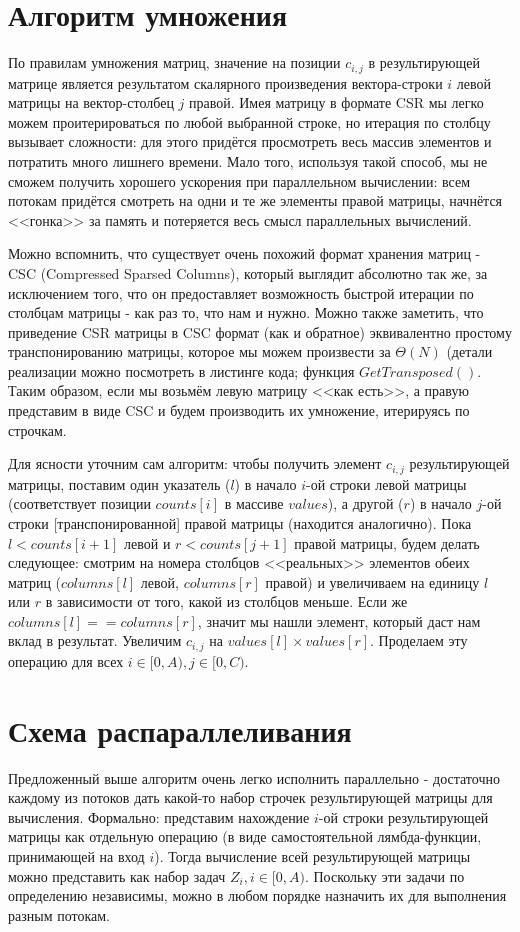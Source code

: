 \documentclass{report}
\begin{document}
\newpage
\section*{Алгоритм умножения}
По правилам умножения матриц, значение на позиции $c_{i, j}$ в результирующей матрице является результатом скалярного произведения вектора-строки $i$ левой матрицы на вектор-столбец $j$ правой. Имея матрицу в формате CSR мы легко можем проитерироваться по любой выбранной строке, но итерация по столбцу вызывает сложности: для этого придётся просмотреть весь массив элементов и потратить много лишнего времени. Мало того, используя такой способ, мы не сможем получить хорошего ускорения при параллельном вычислении: всем потокам придётся смотреть на одни и те же элементы правой матрицы, начнётся <<гонка>> за память и потеряется весь смысл параллельных вычислений.

Можно вспомнить, что существует очень похожий формат хранения матриц - CSC (Compressed Sparsed Columns), который выглядит абсолютно так же, за исключением того, что он предоставляет возможность быстрой итерации по столбцам матрицы - как раз то, что нам и нужно. Можно также заметить, что приведение CSR матрицы в CSC формат (как и обратное) эквивалентно простому транспонированию матрицы, которое мы можем произвести за $\Theta(N)$ (детали реализации можно посмотреть в листинге кода; функция $GetTransposed()$. Таким образом, если мы возьмём левую матрицу <<как есть>>, а правую представим в виде CSC и будем производить их умножение, итерируясь по строчкам.

Для ясности уточним сам алгоритм: чтобы получить элемент $c_{i,j}$ результирующей матрицы, поставим один указатель ($l$) в начало $i$-ой строки левой матрицы (соответствует позиции $counts[i]$ в массиве $values$), а другой ($r$) в начало $j$-ой строки [транспонированной] правой матрицы (находится аналогично). Пока $l < counts[i+1]$ левой и $r < counts[j+1]$ правой матрицы, будем делать следующее: смотрим на номера столбцов <<реальных>> элементов обеих матриц ($columns[l]$ левой, $columns[r]$ правой) и увеличиваем на единицу $l$ или $r$ в зависимости от того, какой из столбцов меньше. Если же $columns[l] == columns[r]$, значит мы нашли элемент, который даст нам вклад в результат. Увеличим $c_{i,j}$ на $values[l] \times values[r]$. Проделаем эту операцию для всех $i \in [0, A), j \in [0, C)$.


\newpage
\section*{Схема распараллеливания}
Предложенный выше алгоритм очень легко исполнить параллельно - достаточно каждому из потоков дать какой-то набор строчек результирующей матрицы для вычисления. Формально: представим нахождение $i$-ой строки результирующей матрицы как отдельную операцию (в виде самостоятельной лямбда-функции, принимающей на вход $i$). Тогда вычисление всей результирующей матрицы можно представить как набор задач $Z_i, i \in [0, A)$. Поскольку эти задачи по определению независимы, можно в любом порядке назначить их для выполнения разным потокам.
\end{document}
